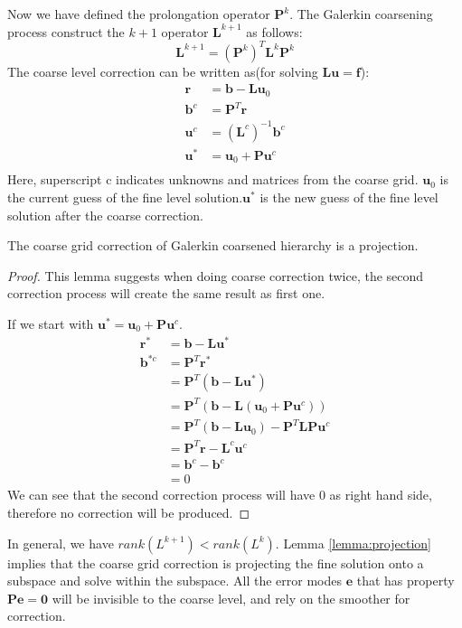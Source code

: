 Now we have defined the prolongation operator $\mathbf{P}^k$. The Galerkin coarsening process construct the $k+1$ operator $\mathbf{L}^{k+1}$ as follows:
\begin{equation}
\mathbf{L}^{k+1} = (\mathbf{P}^k)^T \mathbf{L}^{k}\mathbf{P}^k
\end{equation}
The coarse level correction can be written as(for solving $\mathbf{L}\mathbf{u} = \mathbf{f}$):
\begin{align*}
\mathbf{r} &= \mathbf{b} - \mathbf{L}\mathbf{u}_0 \\
\mathbf{b}^c &= \mathbf{P}^T\mathbf{r} \\
\mathbf{u}^c &= (\mathbf{L}^c)^{-1} \mathbf{b}^c \\
\mathbf{u}^* &= \mathbf{u}_0 + \mathbf{P}\mathbf{u}^c\\
\end{align*}
Here, superscript c indicates unknowns and matrices from the coarse grid. $\mathbf{u}_0$ is the current guess of the fine level solution.$\mathbf{u}^*$ is the new guess of the fine level solution after the coarse correction.
\begin{lem}\label{lemma:projection}The coarse grid correction of Galerkin coarsened hierarchy is a projection.\end{lem}
\begin{proof}
This lemma suggests when doing coarse correction twice, the second correction process will create the same result as first one.

If we start with $\mathbf{u}^* = \mathbf{u}_0 + \mathbf{P}\mathbf{u}^c$.
\begin{align*}
\mathbf{r}^* &= \mathbf{b} - \mathbf{L}\mathbf{u}^* \\
\mathbf{b}^{*c} &= \mathbf{P}^T\mathbf{r}^* \\
&= \mathbf{P}^T(\mathbf{b} - \mathbf{L}\mathbf{u}^*) \\
&= \mathbf{P}^T(\mathbf{b} - \mathbf{L}(\mathbf{u}_0 + \mathbf{P}\mathbf{u}^c))\\
&= \mathbf{P}^T(\mathbf{b} - \mathbf{L}\mathbf{u}_0) - \mathbf{P}^T\mathbf{L}\mathbf{P}\mathbf{u}^c \\
&= \mathbf{P}^T\mathbf{r} - \mathbf{L}^c\mathbf{u}^c \\
&= \mathbf{b}^c - \mathbf{b}^c \\
&= 0
\end{align*}
We can see that the second correction process will have $0$ as right hand side, therefore no correction will be produced.
\end{proof}
In general, we have $rank(L^{k+1}) < rank(L^{k})$. Lemma \ref{lemma:projection} implies that the coarse grid correction is projecting the fine solution onto a subspace and solve within the subspace. All the error modes $\mathbf{e}$ that has property $\mathbf{P}\mathbf{e} = \mathbf{0}$ will be invisible to the coarse level, and rely on the smoother for correction.

